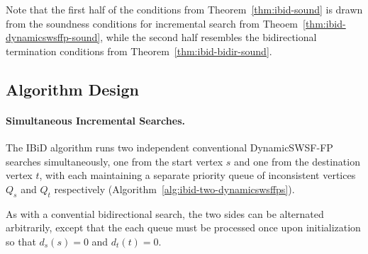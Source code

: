 Note that the first half of the conditions
from Theorem~\ref{thm:ibid-sound}
is drawn from the soundness conditions for incremental search
from Theoem~\ref{thm:ibid-dynamicswsffp-sound},
while the second half resembles the bidirectional termination
conditions from Theorem~\ref{thm:ibid-bidir-sound}.

\subsection{Algorithm Design}

\paragraph{Simultaneous Incremental Searches.}
The IBiD algorithm runs two independent conventional
DynamicSWSF-FP \citep{ramalingam1996dynamicswsffp}
searches simultaneously,
one from the start vertex $s$
and one from the destination vertex $t$,
with each maintaining a separate priority queue of
inconsistent vertices $Q_s$ and $Q_t$ respectively
(Algorithm~\ref{alg:ibid-two-dynamicswsffps}).

As with a convential bidirectional search,
the two sides can be alternated arbitrarily,
except that the each queue must be processed once upon initialization
so that $d_s(s) = 0$ and $d_t(t) = 0$.

